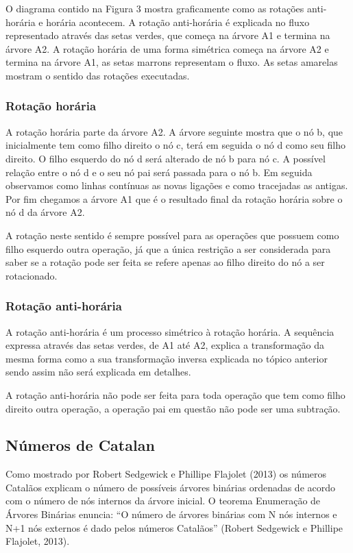 O diagrama contido na Figura 3 mostra graficamente como as rotações anti-horária e horária acontecem. A rotação anti-horária é explicada no fluxo representado através das setas verdes, que começa na árvore A1 e termina na árvore A2. A rotação horária de uma forma simétrica começa na árvore A2 e termina na árvore A1, as setas marrons representam o fluxo. As setas amarelas mostram o sentido das rotações executadas.

\subsubsection{Rotação horária}
A rotação horária parte da árvore A2. A árvore seguinte mostra que o nó b, que inicialmente tem como filho direito o nó c, terá em seguida o nó d como seu filho direito. O filho esquerdo do nó d será alterado de nó b para nó c. A possível relação entre o nó d e o seu nó pai será passada para o nó b. Em seguida observamos como linhas contínuas as novas ligações e como tracejadas as antigas. Por fim chegamos a árvore A1 que é o resultado final da rotação horária sobre o nó d da árvore A2.

	A rotação neste sentido é sempre possível para as operações que possuem como filho esquerdo outra operação, já que a única restrição a ser considerada para saber se a rotação pode ser feita se refere apenas ao filho direito do nó a ser rotacionado.
	
\subsubsection{Rotação anti-horária}
A rotação anti-horária é um processo simétrico à rotação horária. A sequência expressa através das setas verdes, de A1 até A2, explica a transformação da mesma forma como a sua transformação inversa explicada no tópico anterior sendo assim não será explicada em detalhes.

	A rotação anti-horária não pode ser feita para toda operação que tem como filho direito outra operação, a operação pai em questão não pode ser uma subtração.
	
\subsection{Números de Catalan}
Como mostrado por Robert Sedgewick e Phillipe Flajolet (2013) os números Catalãos explicam o número de possíveis árvores binárias ordenadas de acordo com o número de nós internos da árvore inicial. O teorema Enumeração de Árvores Binárias enuncia: “O número de árvores binárias com N nós internos e N+1 nós externos é dado pelos números Catalãos” (Robert Sedgewick e Phillipe Flajolet, 2013).

